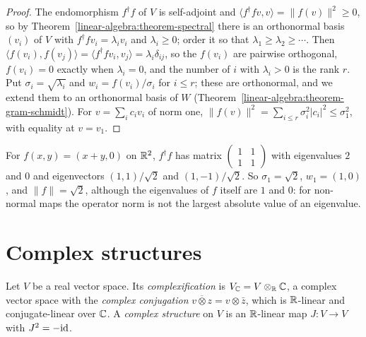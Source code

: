 \begin{proof}
The endomorphism $f^\dagger f$ of $V$ is self-adjoint and $\langle f^\dagger fv, v\rangle = \|f(v)\|^2 \geq 0$, so by Theorem~\ref{linear-algebra:theorem-spectral} there is an orthonormal basis $(v_i)$ of $V$ with $f^\dagger fv_i = \lambda_iv_i$
and $\lambda_i \geq 0$; order it so that $\lambda_1 \geq \lambda_2 \geq \cdots$. Then $\langle f(v_i), f(v_j)\rangle = \langle f^\dagger fv_i, v_j\rangle = \lambda_i\delta_{ij}$, so the $f(v_i)$ are pairwise orthogonal, $f(v_i) = 0$ exactly when
$\lambda_i = 0$, and the number of $i$ with $\lambda_i > 0$ is the rank $r$. Put $\sigma_i = \sqrt{\lambda_i}$ and $w_i = f(v_i)/\sigma_i$ for $i \leq r$; these are orthonormal, and we extend them to an orthonormal basis of
$W$ (Theorem~\ref{linear-algebra:theorem-gram-schmidt}). For $v = \sum_ic_iv_i$ of norm one, $\|f(v)\|^2 = \sum_{i \leq r}\sigma_i^2|c_i|^2 \leq \sigma_1^2$, with equality at $v = v_1$.
\end{proof}

\begin{example}\label{linear-algebra:example-svd}
For $f(x, y) = (x + y, 0)$ on $\mathbb{R}^2$, $f^\dagger f$ has matrix $\begin{pmatrix}1 & 1\\ 1 & 1\end{pmatrix}$ with eigenvalues $2$ and $0$ and eigenvectors $(1, 1)/\sqrt2$ and $(1, -1)/\sqrt2$. So $\sigma_1 = \sqrt2$, $w_1 = (1, 0)$,
and $\|f\| = \sqrt2$, although the eigenvalues of $f$ itself are $1$ and $0$: for non-normal maps the operator norm is not the largest absolute value of an eigenvalue.
\end{example}

\section{Complex structures}\label{linear-algebra:section-complex-structures}

\begin{definition}\label{linear-algebra:definition-complex-structure}
Let $V$ be a real vector space. Its \emph{complexification} is $V_{\mathbb{C}} = V \otimes_{\mathbb{R}} \mathbb{C}$, a complex vector space
with the \emph{complex conjugation} $\overline{v \otimes z} = v \otimes \bar z$, which is $\mathbb{R}$-linear and
conjugate-linear over $\mathbb{C}$. A \emph{complex structure} on $V$ is an $\mathbb{R}$-linear map $J \colon V \to V$ with
$J^2 = -\mathrm{id}$.
\end{definition}

